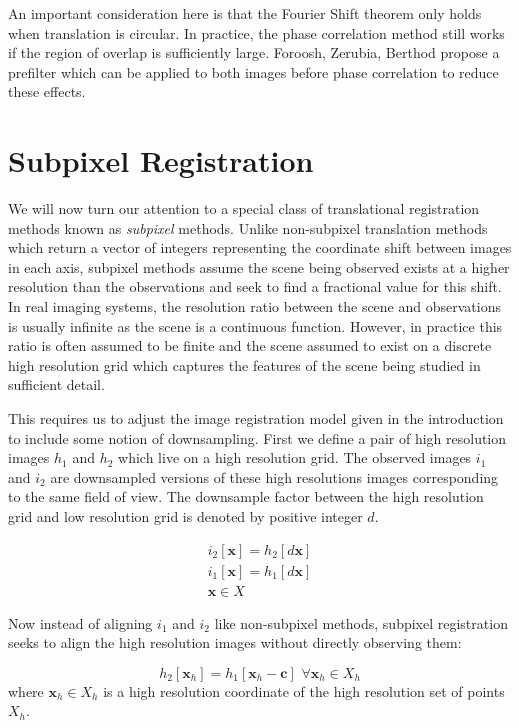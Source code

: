 \documentclass[tocnosub,noragright,centerchapter,12pt]{uiucecethesis09}
\begin{document}
An important consideration here is that the Fourier Shift theorem only holds when translation is circular.  In practice, the phase correlation method still works if the region of overlap is sufficiently large.  Foroosh, Zerubia, Berthod \cite{foroosh} propose a prefilter which can be applied to both images before phase correlation to reduce these effects.

\section{Subpixel Registration} \label{sec:subpixel}

We will now turn our attention to a special class of translational registration methods known as \emph{subpixel} methods.  Unlike non-subpixel translation methods which return a vector of integers representing the coordinate shift between images in each axis, subpixel methods assume the scene being observed exists at a higher resolution than the observations and seek to find a fractional value for this shift.  In real imaging systems, the resolution ratio between the scene and observations is usually infinite as the scene is a continuous function.  However, in practice this ratio is often assumed to be finite and the scene assumed to exist on a discrete high resolution grid which captures the features of the scene being studied in sufficient detail.

This requires us to adjust the image registration model given in the introduction to include some notion of downsampling.  First we define a pair of high resolution images $h_1$ and $h_2$ which live on a high resolution grid.  The observed images $i_1$ and $i_2$ are downsampled versions of these high resolutions images corresponding to the same field of view.  The downsample factor between the high resolution grid and low resolution grid is denoted by positive integer $d$.

\begin{eqnarray*}
  i_2[\bm{x}] = h_{2}[d \bm{x}] \\
  i_1[\bm{x}] = h_{1}[d \bm{x}] \\
  \bm{x} \in X
\end{eqnarray*}

Now instead of aligning $i_1$ and $i_2$ like non-subpixel methods, subpixel registration seeks to align the high resolution images without directly observing them:

$$
h_{2}[\bm{x}_h] = h_{1}[\bm{x}_h - \bm{c}] \,\, \forall \bm{x}_h \in X_h
$$
where $\bm{x}_h \in X_h$ is a high resolution coordinate of the high resolution set of points $X_h$.
\end{document}
